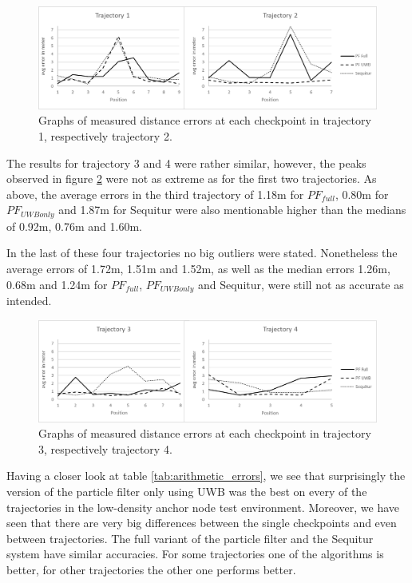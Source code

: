 \begin{figure}[th]
\centering
\includegraphics[width=1.0\textwidth]{Figures/trajectory1_2_results}
\decoRule
\caption[Positioning results trajectory 1 and 2]{Graphs of measured distance errors at each checkpoint in trajectory 1, respectively trajectory 2.}
\label{fig:trajectory1and2_results}
\end{figure}

The results for trajectory 3 and 4 were rather similar, however, the peaks observed in figure \ref{fig:trajectory3and4_results} were not as extreme as for the first two trajectories. As above, the average errors in the third trajectory of 1.18m for $PF_{full}$, 0.80m for $PF_{UWBonly}$ and 1.87m for Sequitur were also mentionable higher than the medians of 0.92m, 0.76m and 1.60m.

In the last of these four trajectories no big outliers were stated. Nonetheless the average errors of 1.72m, 1.51m and 1.52m, as well as the median errors 1.26m, 0.68m and 1.24m for $PF_{full}$, $PF_{UWBonly}$ and Sequitur, were still not as accurate as intended.

\begin{figure}[th]
\centering
\includegraphics[width=1.0\textwidth]{Figures/trajectory3_4_results}
\decoRule
\caption[Positioning results trajectory 3 and 4]{Graphs of measured distance errors at each checkpoint in trajectory 3, respectively trajectory 4.}
\label{fig:trajectory3and4_results}
\end{figure}

Having a closer look at table \ref{tab:arithmetic_errors}, we see that surprisingly the version of the particle filter only using UWB was the best on every of the trajectories in the low-density anchor node test environment. Moreover, we have seen that there are very big differences between the single checkpoints and even between trajectories. The full variant of the particle filter and the Sequitur system have similar accuracies. For some trajectories one of the algorithms is better, for other trajectories the other one performs better.

